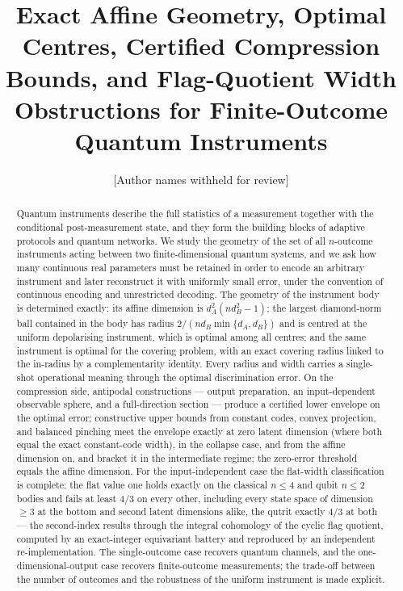 \documentclass[11pt,a4paper]{article}
\title{\bf Exact Affine Geometry, Optimal Centres, Certified Compression Bounds, and Flag-Quotient Width Obstructions for Finite-Outcome Quantum Instruments}
\author{[Author names withheld for review]}
\date{}
\begin{document}
\maketitle

\begin{abstract}
Quantum instruments describe the full statistics of a measurement together with the conditional post-measurement state, and they form the building blocks of adaptive protocols and quantum networks. We study the geometry of the set of all $n$-outcome instruments acting between two finite-dimensional quantum systems, and we ask how many continuous real parameters must be retained in order to encode an arbitrary instrument and later reconstruct it with uniformly small error, under the convention of continuous encoding and unrestricted decoding. The geometry of the instrument body is determined exactly: its affine dimension is $d_A^2(nd_B^2-1)$; the largest diamond-norm ball contained in the body has radius $2/(nd_B\min\{d_A,d_B\})$ and is centred at the uniform depolarising instrument, which is optimal among all centres; and the same instrument is optimal for the covering problem, with an exact covering radius linked to the in-radius by a complementarity identity. Every radius and width carries a single-shot operational meaning through the optimal discrimination error. On the compression side, antipodal constructions --- output preparation, an input-dependent observable sphere, and a full-direction section --- produce a certified lower envelope on the optimal error; constructive upper bounds from constant codes, convex projection, and balanced pinching meet the envelope exactly at zero latent dimension (where both equal the exact constant-code width), in the collapse case, and from the affine dimension on, and bracket it in the intermediate regime; the zero-error threshold equals the affine dimension. For the input-independent case the flat-width classification is complete: the flat value one holds exactly on the classical $n\le4$ and qubit $n\le2$ bodies and fails at least $4/3$ on every other, including every state space of dimension $\ge3$ at the bottom and second latent dimensions alike, the qutrit exactly $4/3$ at both --- the second-index results through the integral cohomology of the cyclic flag quotient, computed by an exact-integer equivariant battery and reproduced by an independent re-implementation. The single-outcome case recovers quantum channels, and the one-dimensional-output case recovers finite-outcome measurements; the trade-off between the number of outcomes and the robustness of the uniform instrument is made explicit.
\end{abstract}
\end{document}
